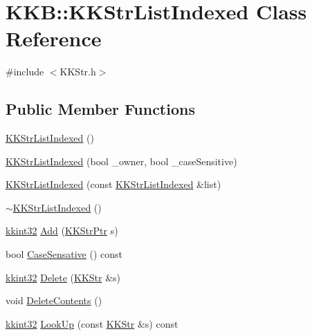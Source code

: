 \hypertarget{class_k_k_b_1_1_k_k_str_list_indexed}{}\section{K\+KB\+:\+:K\+K\+Str\+List\+Indexed Class Reference}
\label{class_k_k_b_1_1_k_k_str_list_indexed}


{\ttfamily \#include $<$K\+K\+Str.\+h$>$}

\subsection*{Public Member Functions}
\begin{DoxyCompactItemize}
\item 
\hyperlink{class_k_k_b_1_1_k_k_str_list_indexed_a302c32e22012a2dda7b959720f1b309d}{K\+K\+Str\+List\+Indexed} ()
\item 
\hyperlink{class_k_k_b_1_1_k_k_str_list_indexed_a01ce7f8522ca7b155c6624ff0458577c}{K\+K\+Str\+List\+Indexed} (bool \+\_\+owner, bool \+\_\+case\+Sensitive)
\item 
\hyperlink{class_k_k_b_1_1_k_k_str_list_indexed_a4bdc30c89c0610a702efd6175a01dc93}{K\+K\+Str\+List\+Indexed} (const \hyperlink{class_k_k_b_1_1_k_k_str_list_indexed}{K\+K\+Str\+List\+Indexed} \&list)
\item 
\hyperlink{class_k_k_b_1_1_k_k_str_list_indexed_a284a8375758711e3683464dfb70b5ade}{$\sim$\+K\+K\+Str\+List\+Indexed} ()
\item 
\hyperlink{namespace_k_k_b_a8fa4952cc84fda1de4bec1fbdd8d5b1b}{kkint32} \hyperlink{class_k_k_b_1_1_k_k_str_list_indexed_a70e2b10a57a8e0bb62f0f50087bbebd5}{Add} (\hyperlink{namespace_k_k_b_a9adbef5a6b3be0867f5570df2a08f388}{K\+K\+Str\+Ptr} s)
\item 
bool \hyperlink{class_k_k_b_1_1_k_k_str_list_indexed_a906341d367af1de19147f5166663b128}{Case\+Sensative} () const 
\item 
\hyperlink{namespace_k_k_b_a8fa4952cc84fda1de4bec1fbdd8d5b1b}{kkint32} \hyperlink{class_k_k_b_1_1_k_k_str_list_indexed_acaa602c81814ef517425d6ac6ea8c76b}{Delete} (\hyperlink{class_k_k_b_1_1_k_k_str}{K\+K\+Str} \&s)
\item 
void \hyperlink{class_k_k_b_1_1_k_k_str_list_indexed_a4f50f6d7735d2e344c8879277c5096b7}{Delete\+Contents} ()
\item 
\hyperlink{namespace_k_k_b_a8fa4952cc84fda1de4bec1fbdd8d5b1b}{kkint32} \hyperlink{class_k_k_b_1_1_k_k_str_list_indexed_acde2ff3f2e16f9274fec0c09dd51b162}{Look\+Up} (const \hyperlink{class_k_k_b_1_1_k_k_str}{K\+K\+Str} \&s) const 

\end{DoxyCompactItemize}
